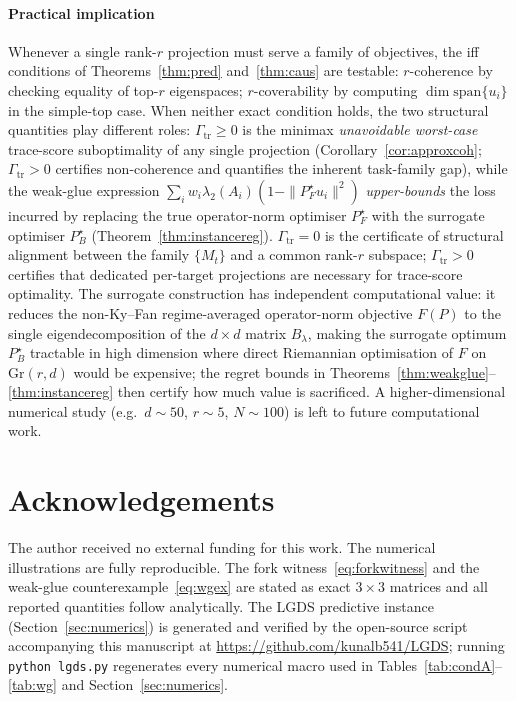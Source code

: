 \documentclass[final,3p,times]{elsarticle}
\newcommand{\Gr}{\mathrm{Gr}}
\begin{document}
\paragraph{Practical implication}
Whenever a single rank-$r$ projection must serve a family of objectives,
the iff conditions of Theorems~\ref{thm:pred} and~\ref{thm:caus} are
testable: $r$-coherence by checking equality of top-$r$ eigenspaces;
$r$-coverability by computing $\dim\mathrm{span}\{u_i\}$ in the
simple-top case.
When neither exact condition holds, the two structural quantities
play different roles:
$\Gamma_{\mathrm{tr}}\ge 0$ is the minimax \emph{unavoidable worst-case}
trace-score suboptimality of any single projection
(Corollary~\ref{cor:approxcoh}; $\Gamma_{\mathrm{tr}}>0$ certifies
non-coherence and quantifies the inherent task-family gap), while the
weak-glue expression
$\sum_i w_i\lambda_2(A_i)(1-\|P_F^\star u_i\|^2)$
\emph{upper-bounds} the loss incurred by replacing the true
operator-norm optimiser $P_F^\star$ with the surrogate optimiser
$P_B^\star$ (Theorem~\ref{thm:instancereg}).
$\Gamma_{\mathrm{tr}}=0$ is the certificate of structural alignment
between the family $\{M_t\}$ and a common rank-$r$ subspace;
$\Gamma_{\mathrm{tr}}>0$ certifies that dedicated per-target
projections are necessary for trace-score optimality.
The surrogate construction has independent computational value: it
reduces the non-Ky--Fan regime-averaged operator-norm objective $F(P)$
to the single eigendecomposition of the $d\times d$ matrix $B_\lambda$,
making the surrogate optimum $P_B^\star$ tractable in high dimension
where direct Riemannian optimisation of $F$ on $\Gr(r,d)$ would be
expensive; the regret bounds in
Theorems~\ref{thm:weakglue}--\ref{thm:instancereg} then certify how
much value is sacrificed.
A higher-dimensional numerical study (e.g.\ $d\sim 50$, $r\sim 5$,
$N\sim 100$) is left to future computational work.

\section*{Acknowledgements}

The author received no external funding for this work.
The numerical illustrations are fully reproducible.
The fork witness~\eqref{eq:forkwitness} and the weak-glue
counterexample~\eqref{eq:wgex} are stated as exact $3\times 3$ matrices
and all reported quantities follow analytically.
The LGDS predictive instance (Section~\ref{sec:numerics}) is generated
and verified by the open-source script accompanying this manuscript at
\url{https://github.com/kunalb541/LGDS}; running \texttt{python lgds.py}
regenerates every numerical macro used in
Tables~\ref{tab:condA}--\ref{tab:wg} and Section~\ref{sec:numerics}.



\end{document}
